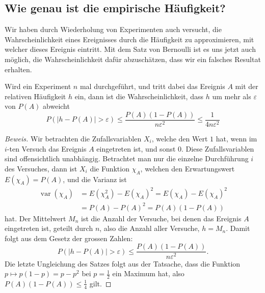 \subsection{Wie genau ist die empirische Häufigkeit?}
Wir haben durch Wiederholung von Experimenten auch versucht, die
Wahrscheinlichkeit eines Ereignisses durch die Häufigkeit zu approximieren,
mit welcher dieses Ereignis eintritt.
Mit dem Satz von Bernoulli ist es uns jetzt auch möglich, die
Wahrscheinlichkeit dafür abzuschätzen, dass wir ein falsches
Resultat erhalten.
\begin{satz}
Wird ein Experiment $n$ mal durchgeführt, und tritt dabei das Ereignis $A$
mit der relativen Häufigkeit $h$ ein, dann ist die Wahrscheinlichkeit,
dass $h$ um mehr als $\varepsilon$ von $P(A)$ abweicht
\[
P(|h- P(A)|>\varepsilon)\le \frac{P(A)(1-P(A))}{n\varepsilon^2}
\le\frac{1}{4n\varepsilon^2}
\]
\end{satz}
\begin{proof}[Beweis]
Wir betrachten die Zufallsvariablen $X_i$, welche den Wert $1$ hat,
wenn im $i$-ten Versuch das Ereignis $A$ eingetreten ist, und sonst $0$.
Diese Zufallsvariablen sind offensichtlich unabhängig.
Betrachtet man
nur die einzelne Durchführung $i$ des Versuches, dann ist $X_i$
die Funktion
$\chi_A$, welchen
den Erwartungswert $E(\chi_A)=P(A)$, und die Varianz ist
\begin{align*}
\operatorname{var}(\chi_A)&=E(\chi_A^2)-E(\chi_A)^2=E(\chi_A)-E(\chi_A)^2\\
&=P(A)-P(A)^2=P(A)(1-P(A))
\end{align*}
hat.
Der Mittelwert $M_n$ ist die Anzahl der Versuche, bei denen das Ereignis
$A$ eingetreten ist, geteilt durch $n$, also die Anzahl aller Versuche,
$h=M_n$.
Damit folgt aus dem Gesetz der grossen Zahlen:
\[
P(|h-P(A)|>\varepsilon)\le\frac{P(A)(1-P(A))}{n\varepsilon^2}.
\]
Die letzte Ungleichung des Satzes folgt aus der Tatsache, dass die Funktion
$p\mapsto p(1-p)=p-p^2$ bei $p=\frac12$ ein Maximum hat, also
$P(A)(1-P(A))\le\frac14$ gilt.
\end{proof}

